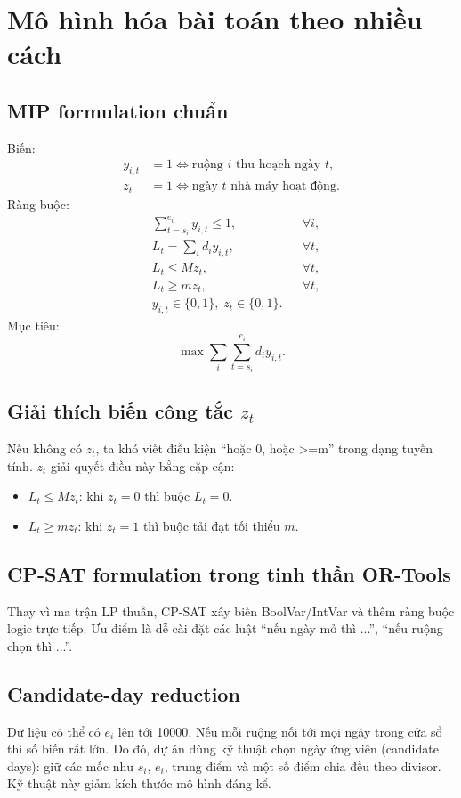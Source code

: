 \documentclass[12pt,a4paper]{article}
\begin{document}
\section{Mô hình hóa bài toán theo nhiều cách}
\subsection{MIP formulation chuẩn}
Biến:
\begin{align}
 y_{i,t} &= 1 \Leftrightarrow \text{ruộng }i\text{ thu hoạch ngày }t,\\
 z_t &= 1 \Leftrightarrow \text{ngày }t\text{ nhà máy hoạt động}.
\end{align}
Ràng buộc:
\begin{align}
&\sum_{t=s_i}^{e_i} y_{i,t} \le 1, &&\forall i,\\
&L_t = \sum_i d_i y_{i,t}, &&\forall t,\\
&L_t \le M z_t, &&\forall t,\\
&L_t \ge m z_t, &&\forall t,\\
&y_{i,t}\in\{0,1\},\; z_t\in\{0,1\}.
\end{align}
Mục tiêu:
\begin{equation}
\max \sum_i\sum_{t=s_i}^{e_i} d_i y_{i,t}.
\end{equation}

\subsection{Giải thích biến công tắc $z_t$}
Nếu không có $z_t$, ta khó viết điều kiện ``hoặc 0, hoặc >=m'' trong dạng tuyến tính.
$z_t$ giải quyết điều này bằng cặp cận:
\begin{itemize}
  \item $L_t \le Mz_t$: khi $z_t=0$ thì buộc $L_t=0$.
  \item $L_t \ge mz_t$: khi $z_t=1$ thì buộc tải đạt tối thiểu $m$.
\end{itemize}

\subsection{CP-SAT formulation trong tinh thần OR-Tools}
Thay vì ma trận LP thuần, CP-SAT xây biến BoolVar/IntVar và thêm ràng buộc logic trực tiếp.
Ưu điểm là dễ cài đặt các luật ``nếu ngày mở thì ...'', ``nếu ruộng chọn thì ...''.

\subsection{Candidate-day reduction}
Dữ liệu có thể có $e_i$ lên tới 10000. Nếu mỗi ruộng nối tới mọi ngày trong cửa sổ thì số biến rất lớn.
Do đó, dự án dùng kỹ thuật chọn ngày ứng viên (candidate days): giữ các mốc như $s_i$, $e_i$, trung điểm và một số điểm chia đều theo divisor.
Kỹ thuật này giảm kích thước mô hình đáng kể.
\end{document}
